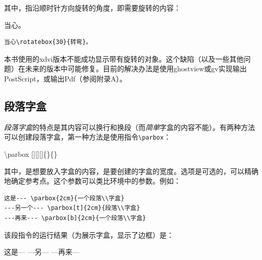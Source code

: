 其中，指沿顺时针方向旋转的角度，即需要旋转的内容：

\begin{codelist}[4.15]{
  当心。
}\begin{verbatim}
当心\rotatebox{30}{转弯}。
\end{verbatim}
\end{codelist}

\begin{ii}
本书使用的xdvi版本不能成功显示带有旋转的对象。这个缺陷（以及一些其他问题）在未来的版本中可能修复。目前的解决办法是使用ghostview或gv实现输出PostScript，或输出Pdf（参阅附录A）。%
\end{ii}

\subsection{段落字盒}

\emph{段落字盒}的特点是其内容可以换行和换段（而\emph{简单}字盒的内容不能）。有两种方法可以创建段落字盒，第一种方法是使用指令\verb|\parbox|：

\begin{dmd}
\backslash parbox [][][]\{\}\{\}
\end{dmd}

其中，是想要放入字盒的内容，是要创建的字盒的宽度。选项是可选的，可以精确地确定参考点。这个参数可以类比环境中的参数。例如：

\begin{dmd}
  \begin{verbatim}
这是--- \parbox{2cm}{一个段落\\字盒}
---另一个--- \parbox[t]{2cm}{段落\\字盒}
---再来--- \parbox[b]{2cm}{一个段落\\字盒}
  \end{verbatim}
\end{dmd}

该段指令的运行结果（为展示字盒，显示了边框）是：

这是--- 
---另--- 
---再来--- 

